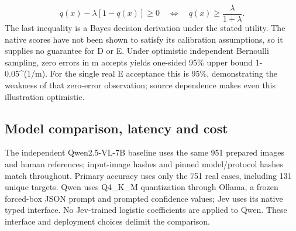 \documentclass[10pt]{article}
\begin{document}
\begin{equation}
q(x)-\lambda[1-q(x)]\geq0\quad\Longleftrightarrow\quad q(x)\geq\frac{\lambda}{1+\lambda}.
\label{eq:6}
\end{equation}
The last inequality is a Bayes decision derivation under the stated utility. The native scores have not been shown to satisfy its calibration assumptions, so it supplies no guarantee for D or E. Under optimistic independent Bernoulli sampling, zero errors in m accepts yields one-sided 95\% upper bound 1-0.05\textasciicircum{}(1/m). For the single real E acceptance this is 95\%, demonstrating the weakness of that zero-error observation; source dependence makes even this illustration optimistic.

\subsection*{Model comparison, latency and cost}
The independent Qwen2.5-VL-7B baseline uses the same 951 prepared images and human references; input-image hashes and pinned model/protocol hashes match throughout. Primary accuracy uses only the 751 real cases, including 131 unique targets. Qwen uses Q4\_K\_M quantization through Ollama, a frozen forced-box JSON prompt and prompted confidence values; Jev uses its native typed interface. No Jev-trained logistic coefficients are applied to Qwen. These interface and deployment choices delimit the comparison.
\end{document}
